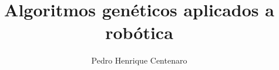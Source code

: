\documentclass[a4paper, 12pt, bibliography=totoc]{scrartcl}
\title{Algoritmos genéticos aplicados a robótica}
\author{Pedro Henrique Centenaro}
\date{}
\begin{document}
\onehalfspacing
\maketitle

\newpage




\printbibliography
\end{document}
